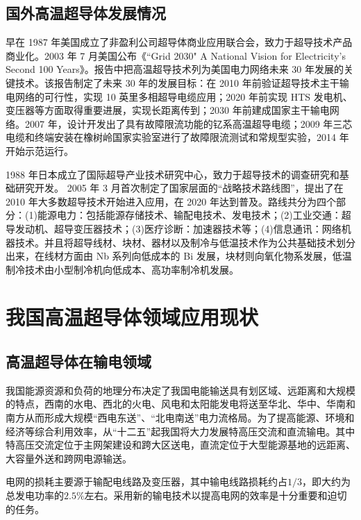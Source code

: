 \documentclass[UTF8, twocolumn]{ctexart}
\begin{document}
    \subsection{国外高温超导体发展情况}

    早在 1987 年美国成立了非盈利公司超导体商业应用联合会，致力于超导技术产品商业化。2003 年 7 月美国公布《“Grid 2030" A National Vision for Electricity's Second 100 Years》\cite{doe2003grid}。报告中把高温超导技术列为美国电力网络未来 30 年发展的关键技术。该报告制定了未来 30 年的发展目标：在 2010 年前验证超导技术主干输电网络的可行性，实现 10 英里多相超导电缆应用；2020 年前实现 HTS 发电机、变压器等方面取得重要进展，实现长距离传到；2030 年前建成国家主干输电网络\cite{冯瑞华2008国外超导材料技术研究政策和方向}。2007 年，设计开发出了具有故障限流功能的钇系高温超导电缆；2009 年三芯电缆和终端安装在橡树岭国家实验室进行了故障限流测试和常规型实验，2014 年开始示范运行。

    1988 年日本成立了国际超导产业技术研究中心，致力于超导技术的调查研究和基础研究开发。 2005 年 3 月首次制定了国家层面的“战略技术路线图”，提出了在 2010 年大多数超导技术开始进入应用，在 2020 年达到普及。路线共分为四个部分：(1)能源电力：包括能源存储技术、输配电技术、发电技术；(2)工业交通：超导发动机、超导变压器技术；(3)医疗诊断：加速器技术等；(4)信息通讯：网络机器技术。并且将超导线材、块材、器材以及制冷与低温技术作为公共基础技术划分出来，在线材方面由 Nb 系列向低成本的 Bi 发展，块材则向氧化物系发展，低温制冷技术由小型制冷机向低成本、高功率制冷机发展。 

\section{我国高温超导体领域应用现状}

    \subsection{高温超导体在输电领域}

    我国能源资源和负荷的地理分布决定了我国电能输送具有划区域、远距离和大规模的特点，西南的水电、西北的火电、风电和太阳能发电将送至华北、华中、华南和南方从而形成大规模“西电东送”、“北电南送”电力流格局\cite{严陆光2014关于发展高温超导输电的建议}。为了提高能源、环境和经济等综合利用效率，从“十二五”起我国将大力发展特高压交流和直流输电。其中特高压交流定位于主网架建设和跨大区送电，直流定位于大型能源基地的远距离、大容量外送和跨网电源输送。

    电网的损耗主要源于输配电线路及变压器，其中输电线路损耗约占$1/3$，即大约为总发电功率的$2.5\%$左右。采用新的输电技术以提高电网的效率是十分重要和迫切的任务。
\end{document}
